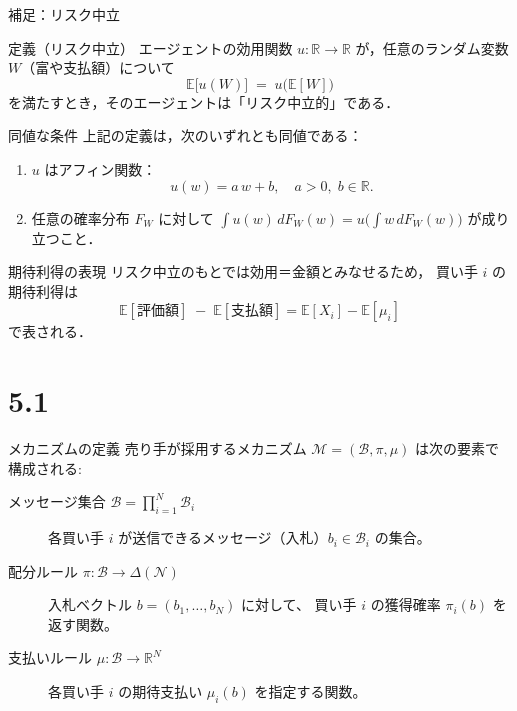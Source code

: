 \documentclass[dvipdfmx,autodetect-engine]{beamer}
\begin{document}
\begin{frame}{補足：リスク中立}
  \tiny\setlength{\parskip}{0pt}\setlength{\topsep}{0pt}
  \vspace{-1ex}
  \begin{block}{定義（リスク中立）}
    エージェントの効用関数 \(u:\mathbb{R}\to\mathbb{R}\) が，任意のランダム変数 \(W\)（富や支払額）について
    \[
      \mathbb{E}\bigl[u(W)\bigr]
      \;=\;
      u\!\bigl(\mathbb{E}[W]\bigr)
    \]
    を満たすとき，そのエージェントは「リスク中立的」である．
  \end{block}

  \vspace{1ex}
  \begin{block}{同値な条件}
    上記の定義は，次のいずれとも同値である：
    \begin{enumerate}
      \item \(u\) はアフィン関数：  
        \[
          u(w)=a\,w + b,\quad a>0,\;b\in\mathbb{R}.
        \]
      \item 任意の確率分布 \(F_W\) に対して
        \(\displaystyle\int u(w)\,dF_W(w)
        =u\!\bigl(\int w\,dF_W(w)\bigr)\) が成り立つこと．
    \end{enumerate}
  \end{block}

  \vspace{1ex}
  \begin{block}{期待利得の表現}
    リスク中立のもとでは効用＝金額とみなせるため，
    買い手 \(i\) の期待利得は
    \[
      \mathbb{E}[\text{評価額}] \;-\; \mathbb{E}[\text{支払額}]
      =\mathbb{E}[X_i] - \mathbb{E}[\mu_i]
    \]
    で表される．
  \end{block}
\end{frame}

\section{5.1}
\begin{frame}{メカニズムの定義}
  売り手が採用するメカニズム $\mathcal{M}=(\mathcal{B},\pi,\mu)$ は次の要素で構成される:
  \begin{description}
    \item[メッセージ集合 $\mathcal{B}=\prod_{i=1}^N\mathcal{B}_i$] 
      各買い手 $i$ が送信できるメッセージ（入札）$b_i\in\mathcal{B}_i$ の集合。
    \item[配分ルール $\pi:\mathcal{B}\to\Delta(\mathcal{N})$] 
      入札ベクトル $b=(b_1,\dots,b_N)$ に対して、
      買い手 $i$ の獲得確率 $\pi_i(b)$ を返す関数。
    \item[支払いルール $\mu:\mathcal{B}\to\mathbb{R}^N$] 
      各買い手 $i$ の期待支払い $\mu_i(b)$ を指定する関数。
  \end{description}
\end{frame}
\end{document}
